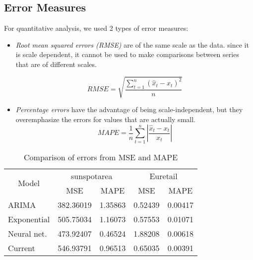 \subsection{Error Measures}
For quantitative analysis, we used 2 types of error measures:

\begin{itemize}
\item \textit{Root mean squared errors (RMSE)} are of the same scale as the data. since it is scale dependent, it cannot be used to make comparisons between series that are of different scales. \cite{Forecasting_OTexts}

$$RMSE=\sqrt{\frac{\sum_{t=1}^{n}(\hat{x}_{t}-x_{t})^{2}}{n}}$$
\item \textit{Percentage errors} have the advantage of being scale-independent, but they overemphasize the errors for values that are actually small.
$$MAPE=\frac{1}{n}\sum_{t=1}^{n}\left | \frac{\hat{x}_{t}-x_{t}}{x_{t}} \right |$$
\end{itemize}


\begin{table}[]
\centering
\caption{Comparison of errors from MSE and MAPE}
\begin{tabular}{|l|l|r|r|r|}
\hline
\multicolumn{1}{|c|}{\multirow{2}{*}{Model}} & \multicolumn{2}{c|}{sunspotarea}                     & \multicolumn{2}{c|}{Euretail}                        \\ \cline{2-5} 
\multicolumn{1}{|c|}{}                       & \multicolumn{1}{c|}{MSE} & \multicolumn{1}{c|}{MAPE} & \multicolumn{1}{c|}{MSE} & \multicolumn{1}{c|}{MAPE} \\ \hline
ARIMA                                        & 382.36019                & 1.35863                   & 0.52439                  & 0.00417                   \\ \hline
Exponential                                  & 505.75034                & 1.16073                   & 0.57553                  & 0.01071                   \\ \hline
Neural net.                                         & 473.92407                & 0.46524                   & 1.88208                  & 0.00618                   \\ \hline
Current                                      & 546.93791                & 0.96513                   & 0.65035                  & 0.00391                   \\ \hline
\end{tabular}
\end{table}

